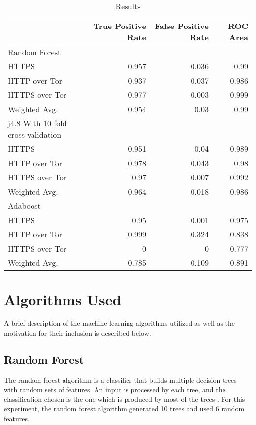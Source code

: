\begin{table}[H]
  \begin{tabular}{lrrr}
    \toprule
    & True Positive Rate & False Positive Rate & ROC Area \\
    \midrule
    Random Forest\\
    \midrule
    HTTPS & 0.957 & 0.036 & 0.99\\
    HTTP over Tor & 0.937 & 0.037 & 0.986\\
    HTTPS over Tor & 0.977 & 0.003 & 0.999\\
    Weighted Avg. & 0.954 & 0.03 & 0.99\\
    \midrule
    j4.8 With 10 fold cross validation\\
    \midrule
    HTTPS & 0.951 & 0.04 & 0.989\\
    HTTP over Tor & 0.978 & 0.043 & 0.98\\
    HTTPS over Tor & 0.97 & 0.007 & 0.992\\
    Weighted Avg. & 0.964 & 0.018 & 0.986\\
    \midrule
    Adaboost\\
    \midrule
    HTTPS & 0.95 & 0.001 & 0.975\\
    HTTP over Tor & 0.999 & 0.324 & 0.838\\
    HTTPS over Tor & 0 & 0 & 0.777\\
    Weighted Avg. & 0.785 & 0.109 & 0.891\\
    \bottomrule
  \end{tabular}
  \caption{Results}
  \label{table:results}
\end{table}

\section{Algorithms Used}

A brief description of the machine learning algorithms utilized as well as the
motivation for their inclusion is described below.

\subsection{Random Forest}

The random forest algorithm is a classifier that builds multiple decision trees
with random sets of features. An input is processed by each tree, and the
classification chosen is the one which is produced by most of the trees
\parencite{Ho:1995vm}. For this experiment, the random forest algorithm
generated 10 trees and used 6 random features.

